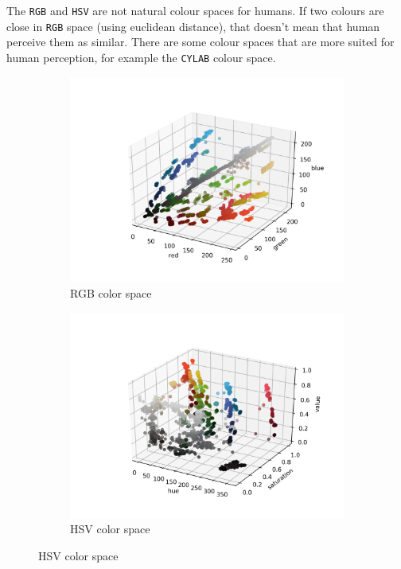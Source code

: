 \documentclass[12pt,a4paper]{article}
\begin{document}
	The \texttt{RGB} and \texttt{HSV} are not natural colour spaces for humans. If two colours are close in \texttt{RGB} space (using euclidean distance), that doesn't mean that human perceive them as similar. There are some colour spaces that are more suited for human perception, for example the \texttt{CYLAB} colour space. \\
	
	
	\begin{center}
		\begin{figure}[H]
			\begin{subfigure}{.5\linewidth}
				\includegraphics[width=\linewidth]{images/rgb.png}
				\caption{RGB color space}
			\end{subfigure}
			\begin{subfigure}{.5\linewidth}
				\includegraphics[width=\linewidth]{images/hsv.png}
				\caption{HSV color space}
			\end{subfigure}
		\end{figure}
	\end{center}
\end{document}

